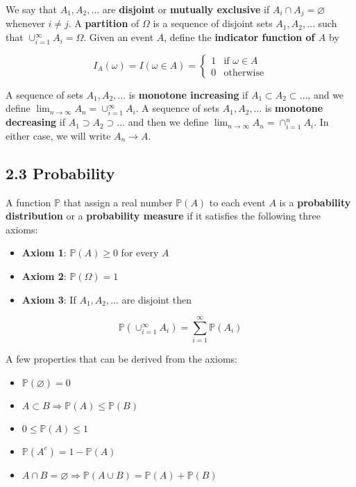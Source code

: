 We say that \(A_{1}, A_{2}, \dots\) are \textbf{disjoint} or \textbf{mutually exclusive} if \(A_{i} \cap A_{j} = \varnothing\) whenever \(i \neq j\). A \textbf{partition} of \(\Omega\) is a sequence of disjoint sets \(A_{1}, A_{2}, \dots\) such that \(\cup_{i=1}^{\infty} A_{i} = \Omega\). Given an event \(A\), define the \textbf{indicator function of \(A\)} by

\[ 
I_A(\omega) = I(\omega \in A) = 
\begin{cases}
1 &\text{if } \omega \in A 
\\
0 &\text{otherwise}
\end{cases}
\]

A sequence of sets \(A_{1}, A_{2}, \dots\) is \textbf{monotone increasing}
if \(A_{1} \subset A_{2} \subset \dots\), and we define \(\lim_{n \rightarrow \infty} A_{n} = \cup_{i=1}^{\infty} A_{i}\). A sequence of sets \(A_{1}, A_{2}, \dots\) is \textbf{monotone decreasing} if \(A_{1} \supset A_{2} \supset \dots\) and then we define \(\lim_{n \rightarrow \infty} A_{n} = \cap_{i=1}^{n} A_{i}\). In either case, we will write \(A_{n} \rightarrow A\).

\subsection*{2.3 Probability}

A function \(\mathbb{P}\) that assign a real number \(\mathbb{P}(A)\) to each event \(A\) is a \textbf{probability distribution} or a \textbf{probability measure} if it satisfies the following three axioms:

\begin{itemize}[tightlist]
\item
  \textbf{Axiom 1}: \(\mathbb{P}(A) \geq 0\) for every \(A\)
\item
  \textbf{Axiom 2}: \(\mathbb{P}(\Omega) = 1\)
\item
  \textbf{Axiom 3}: If \(A_{1}, A_{2}, \dots\) are disjoint then
\end{itemize}

\[ \mathbb{P} \left( \cup_{i=1}^{\infty} A_{i} \right) = \sum_{i=1}^{\infty} \mathbb{P}(A_{i}) \]

A few properties that can be derived from the axioms:

\begin{itemize}[tightlist]
\item
  \(\mathbb{P}(\varnothing) = 0\)
\item
  \(A \subset B \Rightarrow \mathbb{P}(A) \leq \mathbb{P}(B)\)
\item
  \(0 \leq \mathbb{P}(A) \leq 1\)
\item
  \(\mathbb{P}\left(A^{c}\right) = 1 - \mathbb{P}(A)\)
\item
  \(A \cap B = \varnothing \Rightarrow \mathbb{P}(A \cup B) = \mathbb{P}(A) + \mathbb{P}(B)\)
\end{itemize}

